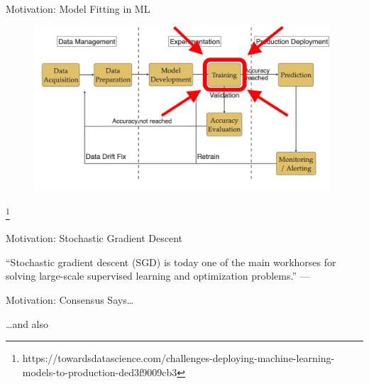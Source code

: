 \documentclass[mathserif,notheorems, hyperref={colorlinks, urlcolor=blue, linkcolor=blue}]{beamer}
\newcommand{\source}[1]{{\let\thefootnote\relax\footnote{{\tiny #1}}}}
\def\\{}%
\begin{document}
    \begin{frame}{Motivation: Model Fitting in ML}
       
       \begin{figure}
            \centering
            \includegraphics[width=0.98\textwidth]{figures/workflow_highlighted} 
       \end{figure} 

       \source{https://towardsdatascience.com/challenges-deploying-machine-learning-models-to-production-ded3f9009cb3}
    \end{frame}
    
    \begin{frame}{Motivation: Stochastic Gradient Descent}

        \begin{center}
            \Large
            ``Stochastic gradient descent (SGD) is today one of the main workhorses for solving large-scale supervised learning and optimization problems.''\\
            ---\citet{drori2019complexity}
        \end{center}

    \end{frame}

    \begin{frame}{Motivation: Consensus Says\ldots}

        \begin{center}
            \Large \dots and also~\citet{xu2017second,
            zhang2016parallel,
            patterson2017deep,
            pillaud2018statistical,
            grosse2015scaling,
            assran2018stochastic,
            damaskinos2019aggregathor,
            kawaguchi2020ordered,
            bernstein2018signsgd,
            li2019rsa,
            agarwal2017second,
            hofmann2015variance,
            geffner2019rule,
            assran2020convergence,
            gower2019sgd}
        \end{center}

    \end{frame}
\end{document}
